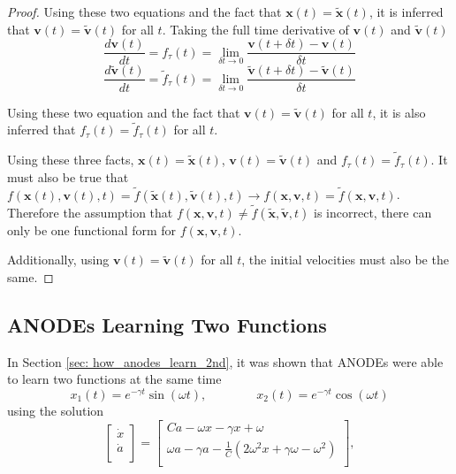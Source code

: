 \documentclass{article}
\theoremstyle{remark}
\theoremstyle{definition}
\begin{document}
\begin{proof}
Using these two equations and the fact that $\mathbf{x}(t) = \tilde{\mathbf{x}}(t)$, it is inferred that $\mathbf{v}(t) = \tilde{\mathbf{v}}(t)$ for all $t$. Taking the full time derivative of $\mathbf{v}(t)$ and $\tilde{\mathbf{v}}(t)$
\begin{equation}
    \frac{d\mathbf{v}(t)}{dt} = f_{\tau}(t) = \lim_{\delta t\to 0}
    \frac{\mathbf{v}(t+\delta t) - \mathbf{v}(t)}{\delta t}
\end{equation}
\begin{equation}
    \frac{d\tilde{\mathbf{v}}(t)}{dt} = \tilde{f}_{\tau}(t) = \lim_{\delta t\to 0}
    \frac{\tilde{\mathbf{v}}(t+\delta t) - \tilde{\mathbf{v}}(t)}{\delta t}
\end{equation}

Using these two equation and the fact that $\mathbf{v}(t) = \tilde{\mathbf{v}}(t)$ for all $t$, it is also inferred that $f_{\tau}(t) = \tilde{f}_{\tau}(t)$ for all $t$.

Using these three facts, $\mathbf{x}(t) = \tilde{\mathbf{x}}(t)$, $\mathbf{v}(t) = \tilde{\mathbf{v}}(t)$ and $f_{\tau}(t) = \tilde{f}_{\tau}(t)$. It must also be true that $f(\mathbf{x}(t), \mathbf{v}(t), t) = \tilde{f}(\tilde{\mathbf{x}}(t), \tilde{\mathbf{v}}(t), t) \xrightarrow{} f(\mathbf{x}, \mathbf{v}, t) = \tilde{f}(\mathbf{x}, \mathbf{v}, t)$. Therefore the assumption that $f(\mathbf{x}, \mathbf{v}, t)\neq\tilde{f}(\tilde{\mathbf{x}}, \tilde{\mathbf{v}}, t)$ is incorrect, there can only be one functional form for $f(\mathbf{x}, \mathbf{v}, t)$.

Additionally, using $\mathbf{v}(t) = \tilde{\mathbf{v}}(t)$ for all $t$, the initial velocities must also be the same.

\end{proof}

\subsection{ANODEs Learning Two Functions}

In Section \ref{sec: how_anodes_learn_2nd}, it was shown that ANODEs were able to learn two functions at the same time
\begin{equation}
    x_{1}(t) = e^{-\gamma t}\sin(\omega t)
    ,\qquad\qquad
    x_{2}(t) = e^{-\gamma t}\cos(\omega t)
\end{equation}
using the solution
\begin{equation}
\begin{bmatrix}
\dot{x}\\
\dot{a}\\
\end{bmatrix}
=
\begin{bmatrix}
Ca -\omega x - \gamma x + \omega\\
\omega a - \gamma a  - \frac{1}{C}(2\omega^{2} x+ \gamma\omega -\omega^{2})\\
\end{bmatrix},
\end{equation}
\end{document}
